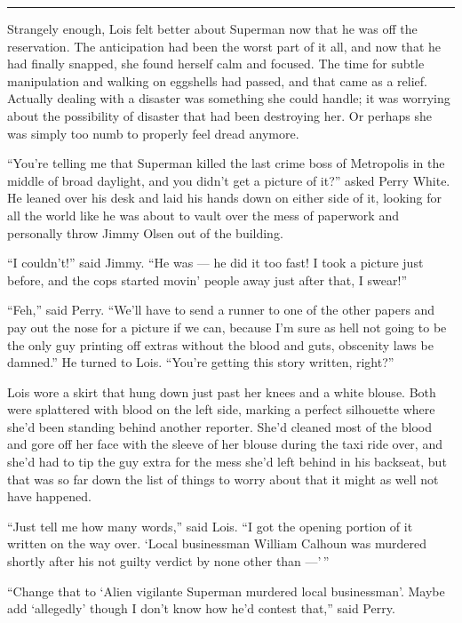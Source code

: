 \begin{center}\rule{0.5\linewidth}{\linethickness}\end{center}

Strangely enough, Lois felt better about Superman now that he was off
the reservation. The anticipation had been the worst part of it all, and
now that he had finally snapped, she found herself calm and focused. The
time for subtle manipulation and walking on eggshells had passed, and
that came as a relief. Actually dealing with a disaster was something
she could handle; it was worrying about the possibility of disaster that
had been destroying her. Or perhaps she was simply too numb to properly
feel dread anymore.

``You're telling me that Superman killed the last crime boss of
Metropolis in the middle of broad daylight, and you didn't get a picture
of it?'' asked Perry White. He leaned over his desk and laid his hands
down on either side of it, looking for all the world like he was about
to vault over the mess of paperwork and personally throw Jimmy Olsen out
of the building.

``I couldn't!'' said Jimmy. ``He was --- he did it too fast! I took a
picture just before, and the cops started movin' people away just after
that, I swear!''

``Feh,'' said Perry. ``We'll have to send a runner to one of the other
papers and pay out the nose for a picture if we can, because I'm sure as
hell not going to be the only guy printing off extras without the blood
and guts, obscenity laws be damned.'' He turned to Lois. ``You're
getting this story written, right?''

Lois wore a skirt that hung down just past her knees and a white blouse.
Both were splattered with blood on the left side, marking a perfect
silhouette where she'd been standing behind another reporter. She'd
cleaned most of the blood and gore off her face with the sleeve of her
blouse during the taxi ride over, and she'd had to tip the guy extra for
the mess she'd left behind in his backseat, but that was so far down the
list of things to worry about that it might as well not have happened.

``Just tell me how many words,'' said Lois. ``I got the opening portion
of it written on the way over. `Local businessman William Calhoun was
murdered shortly after his not guilty verdict by none other than
---'\,''

``Change that to `Alien vigilante Superman murdered local businessman'.
Maybe add `allegedly' though I don't know how he'd contest that,'' said
Perry.

